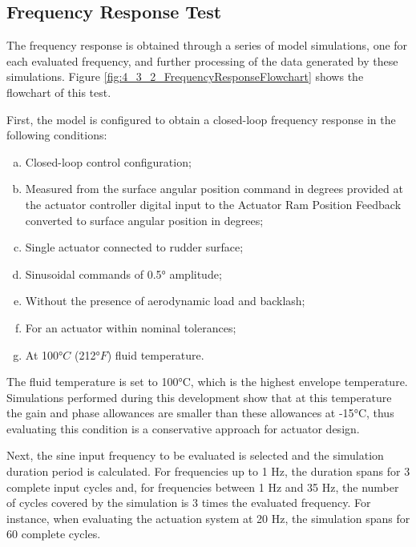 \subsection{Frequency Response Test} \label{4-3-2-FreqRespTest}

The frequency response is obtained through a series of model simulations, one for each evaluated frequency, and further processing of the data generated by these simulations. Figure \ref{fig:4_3_2_FrequencyResponseFlowchart} shows the flowchart of this test.

First, the model is configured to obtain a closed-loop frequency response in the following conditions:

\begin{enumerate}[a)]
	\item Closed-loop control configuration;
	\item Measured from the surface angular position command in degrees provided at the actuator controller digital input to the Actuator Ram Position Feedback converted to
	surface angular position in degrees;
	\item Single actuator connected to rudder surface;	
	\item Sinusoidal commands of 0.5{$°$} amplitude;	
	\item Without the presence of aerodynamic load and backlash;	
	\item For an actuator within nominal tolerances;
	\item At 100$°C$ (212$°F$) fluid temperature.	
\end{enumerate}

The fluid temperature is set to 100$°$C, which is the highest envelope temperature. Simulations performed during this development show that at this temperature the gain and phase allowances are smaller than these allowances at -15$°$C, thus evaluating this condition is a conservative approach for actuator design.

Next, the sine input frequency to be evaluated is selected and the simulation duration period is calculated. For frequencies up to 1 Hz, the duration spans for 3 complete input cycles and, for frequencies between 1 Hz and 35 Hz, the number of cycles covered by the simulation is 3 times the evaluated frequency. For instance, when evaluating the actuation system at 20 Hz, the simulation spans for 60 complete cycles.

